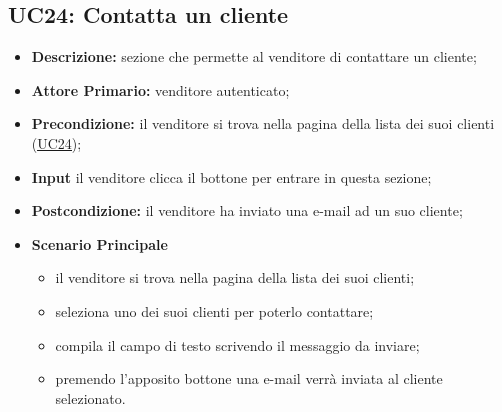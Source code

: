\subsection{UC24: Contatta un cliente}
\label{sec:UC24}
\begin{itemize}
    \item \textbf{Descrizione:} sezione che permette al venditore di contattare un cliente;
    \item \textbf{Attore Primario:} venditore autenticato;
    \item \textbf{Precondizione:} il venditore si trova nella pagina della lista dei suoi clienti (\hyperref[sec:UC24]{\underline{UC24}});
    \item \textbf{Input} il venditore clicca il bottone per entrare in questa sezione;
    \item \textbf{Postcondizione:} il venditore ha inviato una e-mail ad un suo cliente;
    \item \textbf{Scenario Principale}
          \begin{itemize}
              \item il venditore si trova nella pagina della lista dei suoi clienti;
              \item seleziona uno dei suoi clienti per poterlo contattare;
              \item compila il campo di testo scrivendo il messaggio da inviare;
              \item premendo l'apposito bottone una e-mail verrà inviata al cliente selezionato.
          \end{itemize}
\end{itemize}